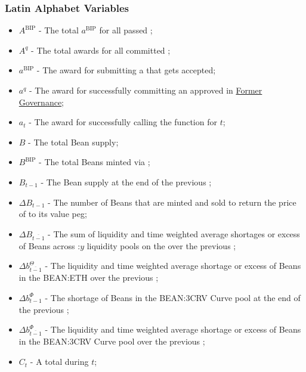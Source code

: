 \documentclass[class=article, crop=false]{standalone}
\begin{document}
\subsubsection{Latin Alphabet Variables}

\begin{itemize}[topsep=0pt, itemsep=3pt,leftmargin=16pt]
    \item[] $A^{\text{BIP}}$ - \hypertarget{ht7}{The total $a^{\text{BIP}}$ for all passed };
    \item[] $A^q$ - \hypertarget{ht8}{The total awards for all committed };
    \item[] $a^{\text{BIP}}$ - \hypertarget{ht9}{The award for submitting a  that gets accepted};
    \item[] $a^q$ - \hypertarget{ht10}{The award for successfully committing an approved  in \hyperlink{subsection.14.3}{Former Governance}};
    \item[] $a_t$ - \hypertarget{ht11}{The award for successfully calling the  function for $t$};
    \item[] $B$ - \hypertarget{ht16}{The total Bean supply};
    \item[] $B^{\text{BIP}}$ - \hypertarget{ht17}{The total Beans minted via };
    \item[] $B_{t-1}$ - The Bean supply at the end of the previous ;
    \item[] $\Delta B_{t-1}$ - \hypertarget{ht49}{The number of Beans that are minted and sold to return the price of  to its value peg};
    \item[] $\Delta B_{\overline{t-1}}$ - \hypertarget{ht50}{The sum of liquidity and time weighted average shortages or excess of Beans across \Bean:$y$ liquidity pools on the  over the previous };
    \item[] $\Delta b_{\overline{t-1}}^{\Theta}$ - The liquidity and time weighted average shortage or excess of Beans in the BEAN:ETH  over the previous ;
    \item[] $\Delta b_{t-1}^{\Phi}$ - \hypertarget{ht51}{The shortage of Beans in the BEAN:3CRV Curve pool at the end of the previous };
    \item[] $\Delta b_{\overline{t-1}}^{\Phi}$ - \hypertarget{ht52}{The liquidity and time weighted average shortage or excess of Beans in the BEAN:3CRV Curve pool over the previous };
    \item[] $C_t$ - \hypertarget{ht29}{A  total  during $t$};

\end{itemize}
\end{document}

